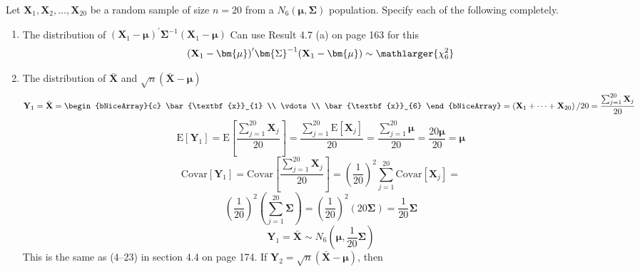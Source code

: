 Let $\textbf{X}_{1},\textbf{X}_{2},\dots,\textbf{X}_{20}$ be a random sample of size $n = 20$ from a $N_{6}(\bm{\mu},\bm{\Sigma})$ population. Specify each of the following completely.
\begin{enumerate}[label= (\alph*)]
    \item The distribution of ${(\textbf{X}_1 - \bm{\mu})}^{\prime}\bm{\Sigma}^{-1}(\textbf{X}_1 - \bm{\mu})$
    \newline
    Can use Result 4.7 (a) on page 163 for this
    \[
        {(\textbf{X}_1 - \bm{\mu})}^{\prime}\bm{\Sigma}^{-1}(\textbf{X}_1 - \bm{\mu})
        \sim
        \mathlarger{\chi_{6}^{2}}
    \]
    \item The distribution of $\bar{\textbf{X}}$ and $\sqrt{n}(\bar{\textbf{X}} - \bm{\mu})$
    \[
        \textbf{Y}_{1}
        =
        \bar{\textbf{X}}
        =
        \begin{bNiceArray}{c}
            \bar{\textbf{x}}_{1} \\
            \vdots \\
            \bar{\textbf{x}}_{6}
        \end{bNiceArray}
        =
        \left(
            \textbf{X}_{1} +
            \cdots +
            \textbf{X}_{20}
        \right) / 20
        =
        \frac{\sum_{j=1}^{20}\textbf{X}_{j}}{20}
    \]
    \[
        \text{E}
        \left[
            \textbf{Y}_{1}
        \right]
        =
        \text{E}
        \left[
            \frac{\sum_{j=1}^{20}\textbf{X}_{j}}{20}
        \right]
        =
        \frac{\sum_{j=1}^{20}\text{E}\left[\textbf{X}_{j}\right]}{20}
        =
        \frac{\sum_{j=1}^{20}\bm{\mu}}{20}
        =
        \frac{20\bm{\mu}}{20}
        =
        \bm{\mu}
    \]
    \[
        \text{Covar}
        \left[
            \textbf{Y}_{1}
        \right]
        =
        \text{Covar}
        \left[
            \frac{\sum_{j=1}^{20}\textbf{X}_{j}}{20}
        \right]
        =
        {\left(\frac{1}{{20}}\right)}^{2}\sum_{j=1}^{20}{\text{Covar}\left[\textbf{X}_{j}\right]}
        =
    \]
    \[
        {\left(\frac{1}{{20}}\right)}^{2}\left(\sum_{j=1}^{20}{\bm{\Sigma}}\right)
        =
        {\left(\frac{1}{{20}}\right)}^{2}\left(20\bm{\Sigma}\right)
        =
        \frac{1}{20}\bm{\Sigma}
    \]
    \[
        \textbf{Y}_{1}
        =
        \bar{\textbf{X}}
        \sim
        N_{6}\left(\bm{\mu}, \frac{1}{20}\bm{\Sigma}\right)
    \]
    This is the same as (4--23) in section 4.4 on page 174.
    \newline
    If $\textbf{Y}_{2} = \sqrt{n}(\bar{\textbf{X}} - \bm{\mu})$, then

\end{enumerate}
